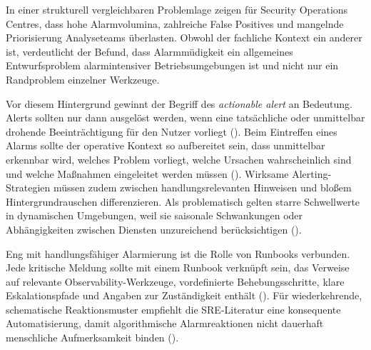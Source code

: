 In einer strukturell vergleichbaren Problemlage zeigen \textcite[S.~2--3]{jalalvand2024alert} für Security Operations Centres, dass hohe Alarmvolumina, zahlreiche False Positives und mangelnde Priorisierung Analyseteams überlasten. Obwohl der fachliche Kontext ein anderer ist, verdeutlicht der Befund, dass Alarmmüdigkeit ein allgemeines Entwurfsproblem alarmintensiver Betriebsumgebungen ist und nicht nur ein Randproblem einzelner Werkzeuge.
 
Vor diesem Hintergrund gewinnt der Begriff des \emph{actionable alert} an Bedeutung. Alerts sollten nur dann ausgelöst werden, wenn eine tatsächliche oder unmittelbar drohende Beeinträchtigung für den Nutzer vorliegt (\cite[S.~63--64]{ewaschukMonitoringDistributedSystems}). Beim Eintreffen eines Alarms sollte der operative Kontext so aufbereitet sein, dass unmittelbar erkennbar wird, welches Problem vorliegt, welche Ursachen wahrscheinlich sind und welche Maßnahmen eingeleitet werden müssen (\cite[S.~174]{vinnakota2025creating}). Wirksame Alerting-Strategien müssen zudem zwischen handlungsrelevanten Hinweisen und bloßem Hintergrundrauschen differenzieren. Als problematisch gelten starre Schwellwerte in dynamischen Umgebungen, weil sie saisonale Schwankungen oder Abhängigkeiten zwischen Diensten unzureichend berücksichtigen (\cite[S.~173, 176]{vinnakota2025creating}).
 
Eng mit handlungsfähiger Alarmierung ist die Rolle von Runbooks verbunden. Jede kritische Meldung sollte mit einem Runbook verknüpft sein, das Verweise auf relevante Observability-Werkzeuge, vordefinierte Behebungsschritte, klare Eskalationspfade und Angaben zur Zuständigkeit enthält (\cite[S.~174]{vinnakota2025creating}). Für wiederkehrende, schematische Reaktionsmuster empfiehlt die SRE-Literatur eine konsequente Automatisierung, damit algorithmische Alarmreaktionen nicht dauerhaft menschliche Aufmerksamkeit binden (\cite[S.~66]{ewaschukMonitoringDistributedSystems}).